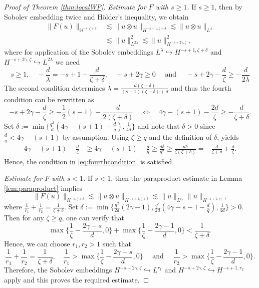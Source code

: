 \documentclass[11pt, a4paper,oneside, reqno]{amsart}
\theoremstyle{remark} %
\theoremstyle{definition} %
\numberwithin{theorem}{section}
\numberwithin{equation}{section}
\newcommand{\Hs}{\mathbb{H}}
\newcommand{\half}{\frac{1}{2}}
\newcommand{\gam}{\gamma}
\begin{document}
\begin{proof}[Proof of Theorem \ref{thm:localWP}]
\textit{Estimate for $F$ with $s\geq 1$.} If $s\geq 1$, then by Sobolev embedding twice and Hölder's inequality, we obtain
\begin{align*}
     \|F(u)\|_{\Hs^{-s,\zeta+\delta}}&\lesssim \|u\otimes u \|_{H^{-s+1,\zeta+\delta}}
     \lesssim \|u\otimes u \|_{L^\lambda}\\
     &\lesssim \|u\|^2_{L^{2\lambda}}\lesssim \|u\|^2_{H^{-s+2\gam,\zeta}},
\end{align*}
where for application of the Sobolev embeddings $L^\lambda\hookrightarrow H^{-s+1, \zeta+\delta}$ and $H^{-s+2\gam, \zeta}\hookrightarrow L^{2\lambda}$ we need
\begin{equation*}
    s\geq 1, \quad -\frac{d}{\lambda}=-s+1-\frac{d}{\zeta+\delta},\quad  -s+2\gam\geq0\quad \text{ and }\quad -s+2\gam-\frac{d}{\zeta}\geq -\frac{d}{2\lambda}
\end{equation*}
The second condition determines $\lambda= \frac{d(\zeta+\delta)}{(s-1)(\zeta+\delta)+d}$ and thus the fourth condition can be rewritten as
\begin{equation}\label{eq:fourthcondition}
    -s+2\gam-\frac{d}{\zeta}\geq -\half(s-1)-\frac{d}{2(\zeta+\delta)}\quad\iff\quad 4\gam-(s+1)-\frac{2d}{\zeta}\geq -\frac{d}{\zeta+\delta}.
\end{equation}
Set $\delta := \min\{\frac{q^2}{d}(4\gam-(s+1)-\frac{d}{q}), \frac{1}{4d}\}$ and note that $\delta>0 $ since $\frac{d}{q}< 4\gam-(s+1)$ by assumption. 
Using $\zeta\geq q$ and the definition of $\delta$, yields
\begin{align*}
    4\gam-(s+1)-\frac{d}{\zeta}&\geq 4\gam-(s+1)-\frac{d}{q} \geq \frac{d\delta}{q^2}\geq \frac{d\delta}{\zeta(\zeta+\delta)}= -\frac{d}{\zeta+\delta}+\frac{d}{\zeta}.
\end{align*}
Hence, the condition in \eqref{eq:fourthcondition} is satisfied. 

\textit{Estimate for $F$ with $s < 1$.} If $s<1$, then the paraproduct estimate in Lemma \ref{lem:paraproduct} implies
\begin{equation*}
    \|F(u)\|_{H^{-s, \zeta+\delta}}\lesssim \|u\otimes u \|_{H^{-s+1, \zeta+\delta}} \lesssim \|u\|_{L^{r_1}}\|u\|_{H^{-s+1, r_2}},
\end{equation*}
where $\frac 1{r_1}+ \frac 1{r_2}=\frac 1{\zeta+\delta}$. Set $\delta:=\min\{\frac{q^2}{2d}(2\gam-1),\frac{q^2}{2d}( 4\gam-s-1-\frac dq), \frac 1{4d}\}>0$. Then for any $\zeta\geq q$, one can verify that
\begin{equation*}
    \max\Big\{\frac 1\zeta -\frac{2\gam-s}{d}, 0\Big\}+ \max\Big\{\frac 1\zeta -\frac{2\gam-1}{d}, 0\Big\}< \frac{1}{\zeta+\delta}.
\end{equation*}
Hence, we can choose $r_1, r_2> 1$ such that
\begin{equation*}
    \frac 1{r_1}+ \frac 1{r_2}=\frac 1{\zeta+\delta}, \quad \frac 1{r_1}> \max\Big\{\frac 1\zeta -\frac{2\gam-s}{d}, 0\Big\}\quad \text{ and }\quad \frac 1{r_2}>\max\Big\{\frac 1\zeta -\frac{2\gam-1}{d}, 0\Big\}.
\end{equation*}
Therefore, the Sobolev embeddings $H^{-s+2\gam, \zeta} \hookrightarrow L^{r_1}$ and $H^{-s+2\gam,\zeta}\hookrightarrow H^{-s+1,r_2}$ apply and this proves the required estimate.


\end{proof}
\end{document}
